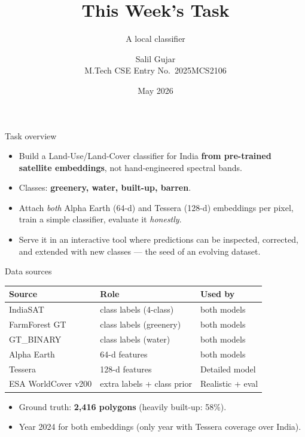 \documentclass[aspectratio=169]{beamer}
\title[This Week's Task]{This Week's Task}
\subtitle{A local classifier}
\author[Salil Gujar]{Salil Gujar \\ \footnotesize M.Tech CSE \quad Entry No.\ 2025MCS2106}
\date{May 2026}
\begin{document}
\frame{\titlepage}

\begin{frame}{Task overview}
\begin{itemize}
  \item Build a Land-Use/Land-Cover classifier for India \textbf{from pre-trained
  satellite embeddings}, not hand-engineered spectral bands.
  \item Classes: \textbf{greenery, water, built-up, barren}.
  \item Attach \emph{both} Alpha Earth (64-d) and Tessera (128-d) embeddings per
  pixel, train a simple classifier, evaluate it \emph{honestly}.
  \item Serve it in an interactive tool where predictions can be inspected,
  corrected, and extended with new classes --- the seed of an evolving dataset.
\end{itemize}
\end{frame}

\begin{frame}{Data sources}
\centering
\small
\begin{tabular}{l l l}
\toprule
\textbf{Source} & \textbf{Role} & \textbf{Used by} \\
\midrule
IndiaSAT          & class labels (4-class)     & both models \\
FarmForest GT     & class labels (greenery)    & both models \\
GT\_BINARY        & class labels (water)       & both models \\
Alpha Earth       & 64-d features              & both models \\
Tessera           & 128-d features             & Detailed model \\
ESA WorldCover v200 & extra labels + class prior & Realistic + eval \\
\bottomrule
\end{tabular}
\vspace{1em}
\begin{itemize}\small
  \item Ground truth: \textbf{2{,}416 polygons} (heavily built-up: 58\%).
  \item Year 2024 for both embeddings (only year with Tessera coverage over India).
\end{itemize}
\end{frame}
\end{document}
